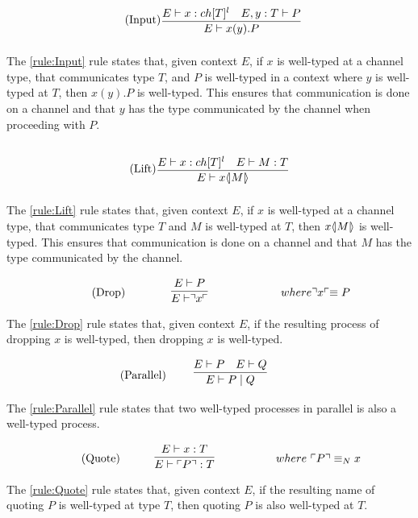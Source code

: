 \begin{align*}
    \tag{Input}\label{rule:Input} &\infrule{E\vdash x:ch[T]^l\quad E,y:T\vdash P}{E \vdash \inp{x}{y}P}
\end{align*}
The \ref{rule:Input} rule states that, given context $E$, if $x$ is well-typed at a channel type, that communicates type $T$, and $P$ is well-typed in a context where $y$ is well-typed at $T$, then $x(y).P$ is well-typed.
This ensures that communication is done on a channel and that $y$ has the type communicated by the channel when proceeding with $P$.

\begin{align*}
    \tag{Lift}\label{rule:Lift} &\infrule{E\vdash x:ch[T]^l\quad E \vdash M:T}{E\vdash \lift{x}{M}}
\end{align*}
The \ref{rule:Lift} rule states that, given context $E$, if $x$ is well-typed at a channel type, that communicates type $T$ and $M$ is well-typed at $T$, then $x \langle \! | M | \! \rangle$ is well-typed.
This ensures that communication is done on a channel and that $M$ has the type communicated by the channel.

\begin{align*}
    \tag{Drop}\label{rule:Drop} &\infrule{E \vdash P}{E\vdash \drop{x}}& where \drop{x} \equiv P
\end{align*}
The \ref{rule:Drop} rule states that, given context $E$, if the resulting process of dropping $x$ is well-typed, then dropping $x$ is well-typed.

\begin{align*}
    \tag{Parallel}\label{rule:Parallel} &\infrule{E\vdash P \quad E \vdash Q}{E \vdash P \para Q}
\end{align*}
The \ref{rule:Parallel} rule states that two well-typed processes in parallel is also a well-typed process.

\begin{align*}
    \tag{Quote}\label{rule:Quote} &\infrule{E \vdash x:T}{E\vdash \quot{P}:T}& where\ \quot{P} \equiv_N x
\end{align*}
The \ref{rule:Quote} rule states that, given context $E$, if the resulting name of quoting $P$ is well-typed at type $T$, then quoting $P$ is also well-typed at $T$.

